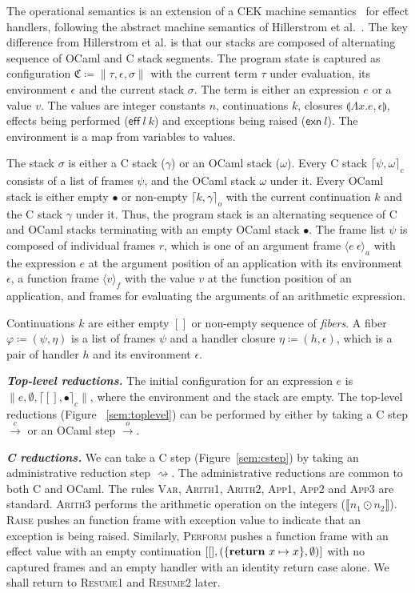 \documentclass[sigplan,10pt,review,anonymous]{acmart}\settopmatter{printfolios=true,printccs=false,printacmref=false}
\newcommand{\lam}[2]{\Lambda #1. #2}
\newcommand{\env}{\epsilon}
\newcommand{\clos}[3]{\llparenthesis \lam{#1}{#2}, #3 \rrparenthesis}
\newcommand{\kw}[1]{\text{\bf #1}}
\newcommand{\effval}[2]{\textsf{eff} ~#1 ~#2}
\newcommand{\exnval}[1]{\textsf{exn} ~#1}
\newcommand{\caseval}[2]{\kw{return}~#1 \mapsto #2}
\newcommand{\farg}[2]{\langle #1 ~#2 \rangle_a}
\newcommand{\ffun}[1]{\langle #1 \rangle_f}
\newcommand{\fiber}{\varphi}
\newcommand{\fl}{\psi} %
\newcommand{\hc}{\eta} %
\newcommand{\cstack}{\gamma} %
\newcommand{\ostack}{\omega} %
\newcommand{\cstacka}[2]{\big \lceil #1, #2 \big \rceil_c} %
\newcommand{\ostacka}[2]{\big \lceil #1, #2 \big \rceil_o} %
\newcommand{\ostackemp}{\bullet}
\newcommand{\stack}{\sigma}
\newcommand{\config}{\mathfrak{C}}
\newcommand{\configa}[3]{\|#1,#2,#3\|}
\newcommand{\ostep}{\xrightarrow{o}}
\newcommand{\cstep}{\xrightarrow{c}}
\begin{document}
The operational semantics is an extension of a CEK machine
semantics~\cite{Felleisen86} for effect handlers, following the abstract
machine semantics of Hillerstrom et al.~\cite{Hillerstrom20}. The key
difference from Hillerstrom et al. is that our stacks are composed of
alternating sequence of OCaml and C stack segments. The program state is
captured as configuration $\config \coloneqq \configa{\tau}{\env}{\stack}$ with
the current term $\tau$ under evaluation, its environment $\env$ and the
current stack $\stack$. The term is either an expression $e$ or a value $v$.
The values are integer constants $n$, continuations $k$, closures
$\clos{x}{e}{\env}$, effects being performed ($\effval{l}{k}$) and exceptions
being raised ($\exnval{l}$). The environment is a map from variables to values.

The stack $\stack$ is either a C stack ($\cstack$) or an OCaml stack
($\ostack$). Every C stack $\cstacka{\fl}{\ostack}$ consists of a list of
frames $\fl$, and the OCaml stack $\ostack$ under it. Every OCaml stack is
either empty $\ostackemp$ or non-empty $\ostacka{k}{\cstack}$ with the current
continuation $k$ and the C stack $\cstack$ under it. Thus, the program stack is
an alternating sequence of C and OCaml stacks terminating with an empty OCaml
stack $\ostackemp$. The frame list $\fl$ is composed of individual frames $r$,
which is one of an argument frame $\farg{e}{\env}$ with the expression $e$ at
the argument position of an application with its environment $\env$, a function
frame $\ffun{v}$ with the value $v$ at the function position of an application,
and frames for evaluating the arguments of an arithmetic expression.

Continuations $k$ are either empty $[]$ or non-empty sequence of \emph{fibers}.
A fiber $\fiber \coloneqq (\fl,\hc)$ is a list of frames $\fl$ and a handler
closure $\hc \coloneqq (h,\env)$, which is a pair of handler $h$ and its
environment $\env$.

\textbf{\textit{Top-level reductions.}} The initial configuration for an expression
$e$ is $\configa{e}{\emptyset}{\cstacka{[]}{\bullet}}$, where the environment
and the stack are empty. The top-level reductions (Figure ~\ref{sem:toplevel})
can be performed by either by taking a C step $\cstep$ or an OCaml step
$\ostep$.

\textbf{\textit{C reductions.}} We can take a C step (Figure~\ref{sem:cstep}) by
taking an administrative reduction step $\rightsquigarrow$. The administrative
reductions are common to both C and OCaml. The rules \textsc{Var},
\textsc{Arith1}, \textsc{Arith2}, \textsc{App1}, \textsc{App2} and
\textsc{App3} are standard. \textsc{Arith3} performs the arithmetic operation
on the integers ($\llbracket n_1 \odot n_2 \rrbracket$). \textsc{Raise} pushes
an function frame with exception value to indicate that an exception is being
raised. Similarly, \textsc{Perform} pushes a function frame with an effect
value with an empty continuation $[[],(\{\caseval{x}{x}\},\emptyset)]$ with no
captured frames and an empty handler with an identity return case alone. We
shall return to \textsc{Resume1} and \textsc{Resume2} later.
\end{document}
